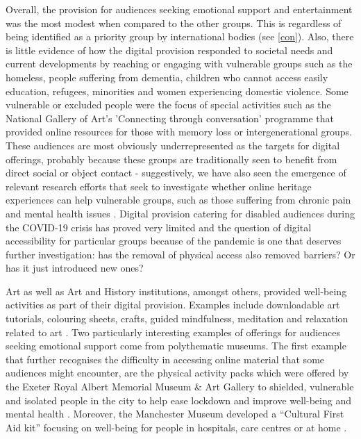\documentclass{egpubl}
\begin{document}
Overall, the provision for audiences seeking emotional support and entertainment was the most modest when compared to the other groups. This is regardless of being identified as a priority group by international bodies (see \ref{con}). Also, there is little evidence of how the digital provision responded to societal needs and current developments by reaching or engaging with vulnerable groups such as the homeless, people suffering from dementia, children who cannot access easily education, refugees, minorities and women experiencing domestic violence. Some vulnerable or excluded people were the focus of special activities such as the National Gallery of Art's 'Connecting through conversation' programme that provided online resources for those with memory loss or intergenerational groups. These audiences are most obviously underrepresented as the targets for digital offerings, probably because these groups are traditionally seen to benefit from direct social or object contact - suggestively, we have also seen the emergence of relevant research efforts that seek to investigate whether online heritage experiences can help vulnerable groups, such as those suffering from chronic pain and mental health issues \cite{O-Ace,CHWA}. Digital provision catering for disabled audiences during the COVID-19 crisis has proved very limited \cite{NationalGalleriesofScotland2020} and the question of digital accessibility for particular groups because of the pandemic is one that deserves further investigation: has the removal of physical access also removed barriers? Or has it just introduced new ones?

 
Art as well as Art and History institutions, amongst others, provided well-being activities as part of their digital provision. Examples include downloadable art tutorials, colouring sheets, crafts, guided mindfulness, meditation and relaxation related to art \cite{VizcayaMuseumGardens2020,CrockerArtMuseum2020,Tate,IronbridgeGorgeMuseums2020}. Two particularly interesting examples of offerings for audiences seeking emotional support come from polythematic museums. The first example that further recognises the difficulty in accessing online material that some audiences might encounter, are the physical activity packs which were offered by the Exeter Royal Albert Memorial Museum \& Art Gallery to shielded, vulnerable and isolated people in the city to help ease lockdown and improve well-being and mental health \cite{Ex2020}. Moreover, the Manchester Museum developed a ``Cultural First Aid kit'' focusing on well-being for people in hospitals, care centres or at home \cite{Man2020}. 
\end{document}
